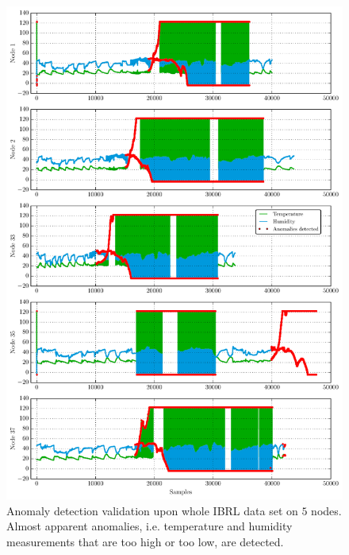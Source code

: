 \documentclass[conference]{IEEEtran}
\theoremstyle{problemstyle}
\begin{document}
\begin{figure}
\centering
\includegraphics[scale=.7]{Python/time_validation.pdf}
\caption{Anomaly detection validation upon whole IBRL data set on $5$ nodes. Almost apparent anomalies, i.e. temperature and humidity measurements that are too high or too low, are detected.}
\label{fig:time_valid}
\end{figure}



\end{document}
